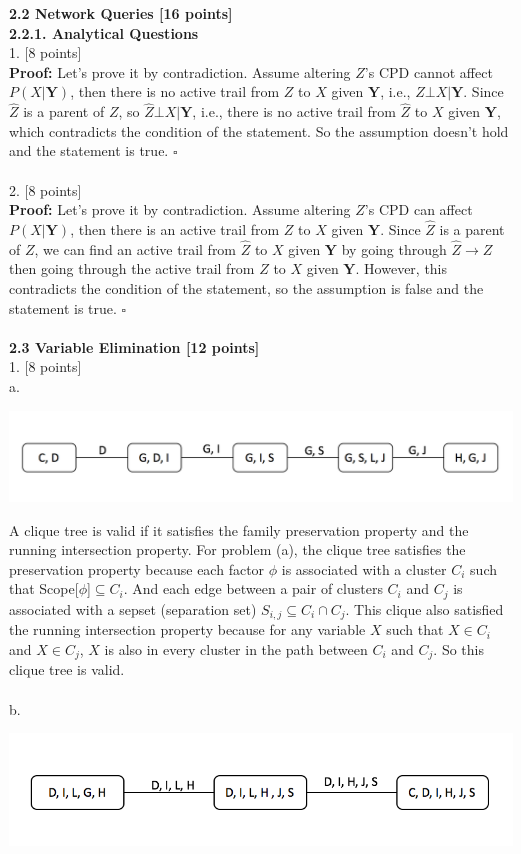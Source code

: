 \documentclass[letterpaper, 11pt]{article}
\begin{document}
\newpage
\noindent \Large \textbf{2.2 Network Queries [16 points]}\\
\large \textbf{2.2.1. Analytical Questions}\\
\large 1. [8 points]\\
\textbf{Proof:}
Let's prove it by contradiction. Assume altering $Z$'s CPD cannot affect $P(X|\mathbf{Y})$, then there is no active trail from $Z$ to $X$ given $\mathbf{Y}$, i.e., $Z \bot X | \mathbf{Y}$. Since $\hat{Z}$ is a parent of $Z$, so $\hat{Z} \bot X | \mathbf{Y}$, i.e., there is no active trail from $\hat{Z}$ to $X$ given $\mathbf{Y}$, which contradicts the condition of the statement. So the assumption doesn't hold and the statement is true. $\square$\\
\\
2. [8 points]\\
\textbf{Proof:}
Let's prove it by contradiction. Assume altering $Z$'s CPD can affect $P(X|\mathbf{Y})$, then there is an active trail from $Z$ to $X$ given $\mathbf{Y}$. Since $\hat{Z}$ is a parent of $Z$, we can find an active trail from $\hat{Z}$ to $X$ given $\mathbf{Y}$ by going through $\hat{Z}\rightarrow Z$ then going through the active trail from $Z$ to $X$ given $\mathbf{Y}$. However, this contradicts the condition of the statement, so the assumption is false and the statement is true. $\square$\\
\\
\noindent \Large \textbf{2.3 Variable Elimination [12 points]}\\
\large 1. [8 points]\\
a.
\begin{center}
\includegraphics[scale=0.75]{a}
\end{center}

A clique tree is valid if it satisfies the family preservation property and the running intersection property. For problem (a), the clique tree satisfies the preservation property because each factor $\phi$ is associated with a cluster $C_i$ such that Scope[$\phi$]$\subseteq C_i$. And each edge between a pair of clusters $C_i$ and $C_j$ is associated with a sepset (separation set) $S_{i,j} \subseteq C_i \cap C_j$. This clique also satisfied the running intersection property because for any variable $X$ such that $X \in C_i$ and $X \in C_j$, $X$ is also in every cluster in the path between $C_i$ and $C_j$. So this clique tree is valid.\\
\\
\noindent
b.
\begin{center}
\includegraphics[scale=1]{b}
\end{center}
\end{document}
